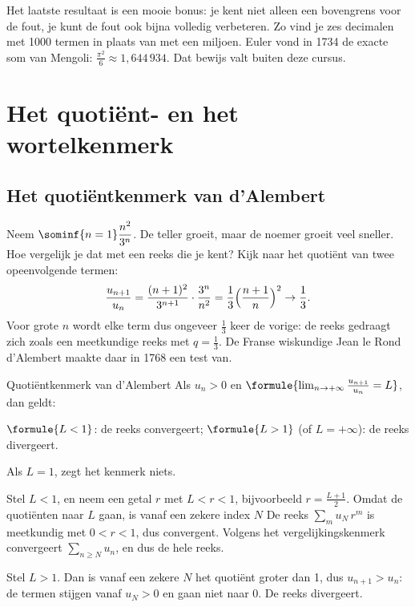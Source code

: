 Het laatste resultaat is een mooie bonus: je kent niet alleen een bovengrens voor de fout, je kunt de fout ook bijna volledig verbeteren. Zo vind je zes decimalen met 1000 termen in plaats van met een miljoen. Euler vond in 1734 de exacte som van Mengoli: $\tfrac{\pi^2}{6} \approx 1{,}644\,934$. Dat bewijs valt buiten deze cursus.

\begin{oefeningen}
\end{oefeningen}

\section{Het quotiënt- en het wortelkenmerk}

\subsection{Het quotiëntkenmerk van d'Alembert}

Neem $\sominf{n=1} \dfrac{n^2}{3^n}$. De teller groeit, maar de noemer groeit veel sneller. Hoe vergelijk je dat met een reeks die je kent? Kijk naar het quotiënt van twee opeenvolgende termen:
\[ \frac{u_{n+1}}{u_n} = \frac{(n+1)^2}{3^{n+1}} \cdot \frac{3^n}{n^2} = \frac13\Bigl(\frac{n+1}{n}\Bigr)^2 \to \frac13 . \]
Voor grote $n$ wordt elke term dus ongeveer $\tfrac13$ keer de vorige: de reeks gedraagt zich zoals een meetkundige reeks met $q = \tfrac13$. De Franse wiskundige Jean le Rond d'Alembert maakte daar in 1768 een test van.

\begin{theorie}
\begin{stelling}{Quotiëntkenmerk van d'Alembert}
Als $u_n > 0$ en \quad $\formule{\lim_{n\to+\infty} \frac{u_{n+1}}{u_n} = L}$, \quad dan geldt:

\vspace{1mm}
\qquad $\formule{L < 1}$: de reeks convergeert; \qquad $\formule{L > 1}$ (of $L = +\infty$): de reeks divergeert.

\vspace{1mm}
Als $L = 1$, zegt het kenmerk niets.
\end{stelling}

\begin{bewijs}
Stel $L < 1$, en neem een getal $r$ met $L < r < 1$, bijvoorbeeld $r = \tfrac{L+1}{2}$. Omdat de quotiënten naar $L$ gaan, is vanaf een zekere index $N$
De reeks $\sum_m u_N\,r^m$ is meetkundig met $0 < r < 1$, dus convergent. Volgens het vergelijkingskenmerk convergeert $\sum_{n \geqslant N} u_n$, en dus de hele reeks.

Stel $L > 1$. Dan is vanaf een zekere $N$ het quotiënt groter dan 1, dus $u_{n+1} > u_n$: de termen stijgen vanaf $u_N > 0$ en gaan niet naar 0. De reeks divergeert.
\end{bewijs}
\end{theorie}

